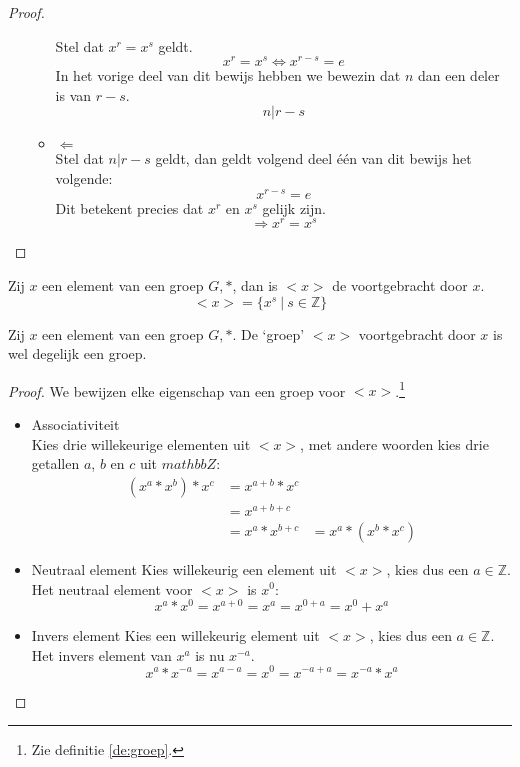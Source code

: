 \documentclass[main.tex]{subfiles}
\begin{document}
\begin{ei}
\begin{proof}
\begin{itemize}
\begin{itemize}
        Stel dat $x^{r} = x^{s}$ geldt.
        \[ x^{r} = x^{s} \Leftrightarrow x^{r-s} = e \]
        In het vorige deel van dit bewijs hebben we bewezin dat $n$ dan een deler is van $r-s$.
        \[ n|r-s \]
      \item $\Leftarrow$\\
        Stel dat $n | r-s$ geldt, dan geldt volgend deel \'e\'en van dit bewijs het volgende:
        \[ x^{r-s} = e \]
        Dit betekent precies dat $x^{r}$ en $x^{s}$ gelijk zijn.
        \[ \Rightarrow x^{r} = x^{s} \]
      \end{itemize}
    \end{itemize}
  \end{proof}
\end{ei}

\begin{de}
  Zij $x$ een element van een groep $G,*$, dan is $<x>$ de  voortgebracht door $x$.
  \[ <x> = \{ x^{s}\ |\ s \in \mathbb{Z} \} \]
\end{de}

\begin{st}
  \label{st:voortbrenging-is-groep}
  Zij $x$ een element van een groep $G,*$.
  De `groep' $<x>$ voortgebracht door $x$ is wel degelijk een groep.

  \begin{proof}
    We bewijzen elke eigenschap van een groep voor $<x>$.\footnote{Zie definitie \ref{de:groep}.}
    \begin{itemize}
    \item Associativiteit\\
      Kies drie willekeurige elementen uit $<x>$, met andere woorden kies drie getallen $a$, $b$ en $c$ uit $mathbb{Z}$:
      \[
      \begin{array}{rll}
      (x^{a} * x^{b})* x^{c} &= x^{a+b} * x^{c} &\\
                           &= x^{a+b+c}       &\\
                           &= x^{a} * x^{b+c} &= x^{a} * (x^{b} * x^{c})
      \end{array}
      \]
    \item Neutraal element
      Kies willekeurig een element uit $<x>$, kies dus een $a\in \mathbb{Z}$.
      Het neutraal element voor $<x>$ is $x^{0}$:
      \[ x^{a} * x^{0} = x^{a+0} = x^{a} = x^{0+a} = x^{0} + x^{a} \]
    \item Invers element
      Kies een willekeurig element uit $<x>$, kies dus een $a \in \mathbb{Z}$.
      Het invers element van $x^{a}$ is nu $x^{-a}$.
      \[ x^{a}*x^{-a} = x^{a-a} = x^{0} = x^{-a+a} = x^{-a} * x^{a} \]
    \end{itemize}
  \end{proof}

\end{st}
\end{document}
